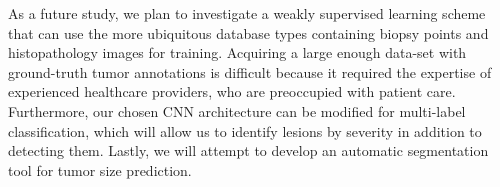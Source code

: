 As a future study, we plan to investigate a weakly supervised learning scheme that can use the more ubiquitous database types containing biopsy points and histopathology images for training. Acquiring a large enough data-set with ground-truth tumor annotations is difficult because it required the expertise of experienced healthcare providers, who are preoccupied with patient care. Furthermore, our chosen CNN architecture can be modified for multi-label classification, which will allow us to identify lesions by severity in addition to detecting them. Lastly, we will attempt to develop an automatic segmentation tool for tumor size prediction. 
